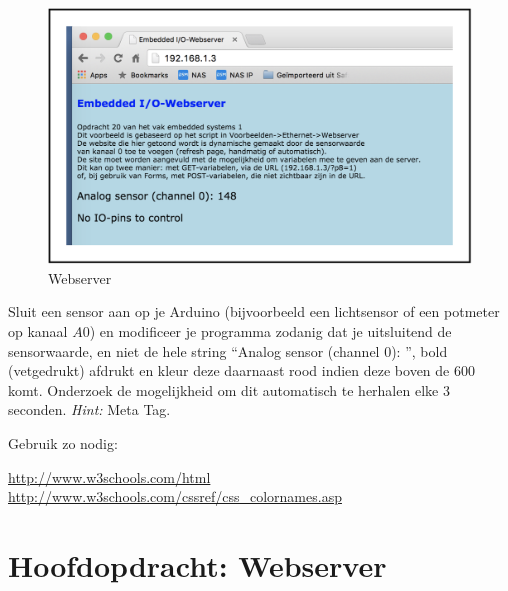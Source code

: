 \begin{figure}[h!]
\centering\includegraphics[scale=0.25]{Pictures/chapter01/webserver.png}
\caption{Webserver}
\label{fig:webserver} %
\end{figure}

\begin{exercise}
Sluit een sensor aan op je Arduino (bijvoorbeeld een lichtsensor of een potmeter op kanaal $A0$) en modificeer je programma zodanig dat je uitsluitend de sensorwaarde, en niet de hele string “Analog sensor (channel 0): ”, bold (vetgedrukt) afdrukt en kleur deze daarnaast rood indien deze boven de $600$ komt. Onderzoek de mogelijkheid om dit automatisch te herhalen elke 3 seconden. \textit{Hint:} Meta Tag.

Gebruik zo nodig: 

\url{http://www.w3schools.com/html http://www.w3schools.com/cssref/css_colornames.asp}
\end{exercise}

\section{Hoofdopdracht: Webserver}
\ 

